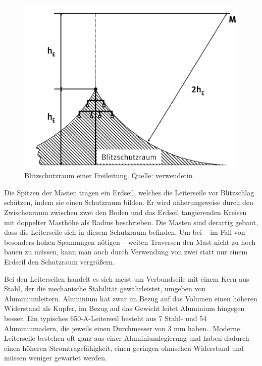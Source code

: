 \begin{figure}[tbhn]
\begin{center}
\noindent
\includegraphics[scale=0.8]{blitzschutzraum.png}
\end{center}
\caption{Blitzschutzraum einer Freileitung. Quelle: \cite{Harnischmacher} verwendetin \cite{BfN}} %
\label{pic:blitzschutzraum}
\end{figure}

Die Spitzen der Masten tragen ein Erdseil, welches die Leiterseile vor Blitzschlag schützen, indem sie einen Schutzraum bilden. Er wird näherungsweise durch den Zwischenraum zwischen zwei den Boden und das Erdseil tangierenden Kreisen mit doppelter Masthöhe als Radius beschrieben. Die Masten sind derartig gebaut, dass die Leiterseile sich in diesem Schutzraum befinden. Um bei – im Fall von besonders hohen Spannungen nötigen – weiten Traversen den Mast nicht zu hoch bauen zu müssen, kann man auch durch Verwendung von zwei statt nur einem Erdseil den Schutzraum vergrößern.

Bei den Leiterseilen handelt es sich meist um Verbundseile mit einem Kern aus Stahl, der die mechanische Stabilität gewährleistet, umgeben von Aluminiumleitern. Aluminium hat zwar im Bezug auf das Volumen einen höheren Widerstand als Kupfer, im Bezug auf das Gewicht leitet Aluminium hingegen besser. Ein typisches 650-A-Leiterseil besteht aus 7 Stahl- und 54 Aluminiumadern, die jeweils einen Durchmesser von 3 mm haben.\cite{Harrison}.
Moderne Leiterseile bestehen oft ganz aus einer Aluminiumlegierung und haben dadurch einen höheren Stromtragefähigkeit, einen geringen ohmschen Widerstand und müssen weniger gewartet werden\cite{Harrison}.

